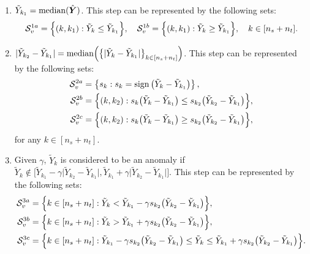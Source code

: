 \begin{enumerate}
	\item $\tilde{Y}_{k_1} = {\rm median} (\hat{\bm Y})$. This step can be represented by the following sets:
	\begin{align} \label{eq:condition_1}
	\begin{aligned}
		{\mathcal S}_v^{1a} = \Big \{ 
			(k, k_1) : \tilde{Y}_k \leq \tilde{Y}_{k_1}
		\Big \},  \quad 
		{\mathcal S}_v^{1b} = \Big \{ 
			(k, k_1) : \tilde{Y}_k \geq \tilde{Y}_{k_1}
		\Big \},
		\quad k \in [n_s + n_t].
	\end{aligned}
	\end{align}
	\item $|\tilde{Y}_{k_2} - \tilde{Y}_{k_1}| = {\rm median} \Big( \big \{ | \tilde{Y}_k - \tilde{Y}_{k_1} | \big \}_{k \in [n_s + n_t]} \Big )$.
	This step can be represented by the following sets:
	\begin{subequations} \label{eq:condition_2}
	\begin{align} %
		\cS_v^{2a} &= 
		\left \{ 
			s_k : s_k = {\rm sign} \left(\tilde{Y}_k - \tilde{Y}_{k_1}\right)
		\right \}, \\ 
		\cS_v^{2b} &= \Big \{ 
			(k, k_2) : s_k \big (\tilde{Y}_k - \tilde{Y}_{k_1}\big ) \leq s_{k_2} \big (\tilde{Y}_{k_2} - \tilde{Y}_{k_1}\big )
		\Big \}, \\  
		\cS_v^{2c} &= \Big \{ 
			(k, k_2) : s_k \big (\tilde{Y}_k - \tilde{Y}_{k_1}\big ) \geq s_{k_2} \big (\tilde{Y}_{k_2} - \tilde{Y}_{k_1}\big )
		\Big \},
	\end{align}
	\end{subequations}
	for any $k \in [n_s + n_t]$.
	\item Given $\gamma$, $\tilde{Y}_k$ is considered to be an anomaly if 
	$\tilde{Y}_k \not \in \Big [\tilde{Y}_{k_1} - \gamma \big |\tilde{Y}_{k_2} - \tilde{Y}_{k_1} \big |, \tilde{Y}_{k_1} + \gamma \big |\tilde{Y}_{k_2} - \tilde{Y}_{k_1} \big |\Big]$.
	This step can be represented by the following sets:
	\begin{subequations} \label{eq:condition_3}
	\begin{align}
		{\mathcal S}_v^{3a} &= 
		\Big \{
			k \in [n_s + n_t] :  \tilde{Y}_k < \tilde{Y}_{k_1} - \gamma s_{k_2}\big (\tilde{Y}_{k_2} - \tilde{Y}_{k_1} \big )
		\Big\}, \\ 
		{\mathcal S}_v^{3b} &= 
		\Big \{
			k \in [n_s + n_t] :  \tilde{Y}_k > \tilde{Y}_{k_1} + \gamma s_{k_2}\big (\tilde{Y}_{k_2} - \tilde{Y}_{k_1} \big )
		\Big\}, \\ 
		{\mathcal S}_v^{3c} &= 
		\Big \{
			k \in [n_s + n_t] :  
			\tilde{Y}_{k_1} - \gamma s_{k_2}\big (\tilde{Y}_{k_2} - \tilde{Y}_{k_1} \big )
			\leq
			\tilde{Y}_k
			\leq
			\tilde{Y}_{k_1} + \gamma s_{k_2}\big (\tilde{Y}_{k_2} - \tilde{Y}_{k_1} \big ) \label{eq:condition_3_last}
		\Big\}. 
	\end{align}
	\end{subequations}
\end{enumerate}


